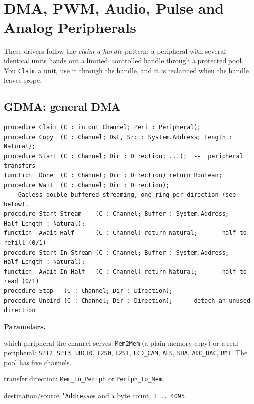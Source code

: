 \chapter{DMA, PWM, Audio, Pulse and Analog Peripherals}
\label{ch:hal2}

These drivers follow the \emph{claim-a-handle} pattern: a peripheral with several
identical units hands out a limited, controlled handle through a protected pool.
You \texttt{Claim} a unit, use it through the handle, and it is reclaimed when the
handle leaves scope.

\section{GDMA: general DMA}

\begin{lstlisting}
procedure Claim (C : in out Channel; Peri : Peripheral);
procedure Copy  (C : Channel; Dst, Src : System.Address; Length : Natural);
procedure Start (C : Channel; Dir : Direction; ...);  --  peripheral transfers
function  Done  (C : Channel; Dir : Direction) return Boolean;
procedure Wait  (C : Channel; Dir : Direction);
--  Gapless double-buffered streaming, one ring per direction (see below).
procedure Start_Stream    (C : Channel; Buffer : System.Address; Half_Length : Natural);
function  Await_Half      (C : Channel) return Natural;   --  half to refill (0/1)
procedure Start_In_Stream (C : Channel; Buffer : System.Address; Half_Length : Natural);
function  Await_In_Half   (C : Channel) return Natural;   --  half to read (0/1)
procedure Stop   (C : Channel; Dir : Direction);
procedure Unbind (C : Channel; Dir : Direction);  --  detach an unused direction
\end{lstlisting}

\textbf{Parameters.}
\begin{description}[style=nextline]
\item[\texttt{Peri}] which peripheral the channel serves: \texttt{Mem2Mem} (a
  plain memory copy) or a real peripheral: \texttt{SPI2}, \texttt{SPI3},
  \texttt{UHCI0}, \texttt{I2S0}, \texttt{I2S1}, \texttt{LCD\_CAM}, \texttt{AES},
  \texttt{SHA}, \texttt{ADC\_DAC}, \texttt{RMT}. The pool has five channels.
\item[\texttt{Dir}] transfer direction: \texttt{Mem\_To\_Periph} or
  \texttt{Periph\_To\_Mem}.
\item[\texttt{Dst}, \texttt{Src}, \texttt{Length}] destination/source
  \texttt{'Address}es and a byte count, \texttt{1\,..\,4095}.
\end{description}

